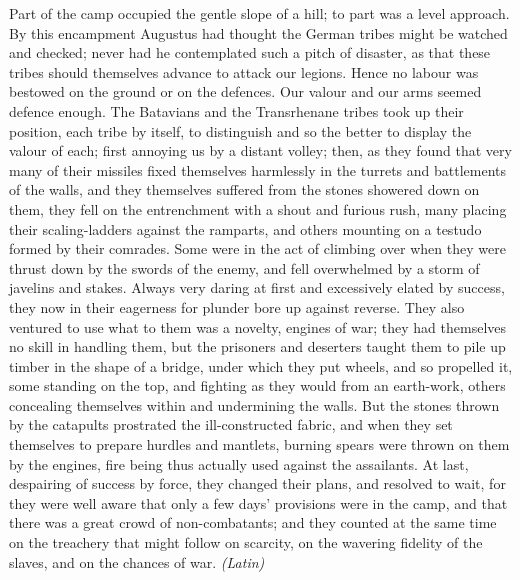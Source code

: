 Part of the camp occupied the gentle slope of a hill; to part was a level approach. By this encampment Augustus had thought the German tribes might be watched and checked; never had he contemplated such a pitch of disaster, as that these tribes should themselves advance to attack our legions. Hence no labour was bestowed on the ground or on the defences. Our valour and our arms seemed defence enough. The Batavians and the Transrhenane tribes took up their position, each tribe by itself, to distinguish and so the better to display the valour of each; first annoying us by a distant volley; then, as they found that very many of their missiles fixed themselves harmlessly in the turrets and battlements of the walls, and they themselves suffered from the stones showered down on them, they fell on the entrenchment with a shout and furious rush, many placing their scaling-ladders against the ramparts, and others mounting on a testudo formed by their comrades. Some were in the act of climbing over when they were thrust down by the swords of the enemy, and fell overwhelmed by a storm of javelins and stakes. Always very daring at first and excessively elated by success, they now in their eagerness for plunder bore up against reverse. They also ventured to use what to them was a novelty, engines of war; they had themselves no skill in handling them, but the prisoners and deserters taught them to pile up timber in the shape of a bridge, under which they put wheels, and so propelled it, some standing on the top, and fighting as they would from an earth-work, others concealing themselves within and undermining the walls. But the stones thrown by the catapults prostrated the ill-constructed fabric, and when they set themselves to prepare hurdles and mantlets, burning spears were thrown on them by the engines, fire being thus actually used against the assailants. At last, despairing of success by force, they changed their plans, and resolved to wait, for they were well aware that only a few days' provisions were in the camp, and that there was a great crowd of non-combatants; and they counted at the same time on the treachery that might follow on scarcity, on the wavering fidelity of the slaves, and on the chances of war. \emph{(Latin)}


